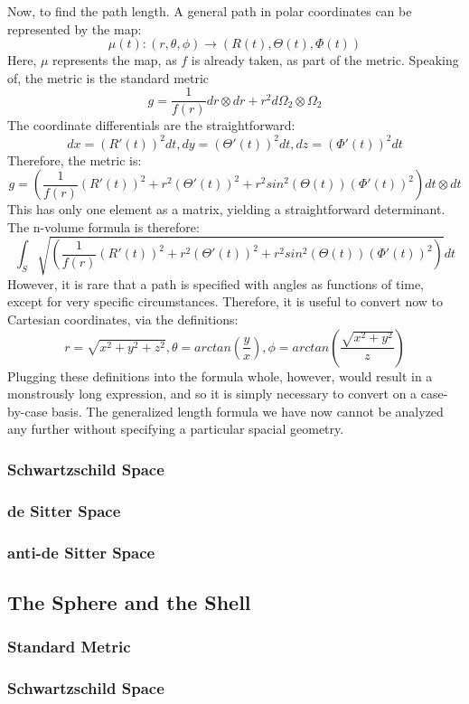 \documentclass{article}
\begin{document}
Now, to find the path length. A general path in polar coordinates can be represented by the map:
\[
\mu(t): (r, \theta, \phi) \rightarrow (R(t), \Theta(t), \Phi(t))
\]
Here, $\mu$ represents the map, as $f$ is already taken, as part of the metric. Speaking of, the metric is the standard metric
\[
g = \frac{1}{f(r)} dr \otimes dr + r^2 d\Omega_2 \otimes \Omega_2
\]
The coordinate differentials are the straightforward:
\[
dx = (R'(t))^2 dt, dy = (\Theta'(t))^2 dt, dz = (\Phi'(t))^2 dt
\]
Therefore, the metric is:
\[
g = (\frac{1}{f(r)}(R'(t))^2 + r^2 (\Theta'(t))^2 + r^2 sin^2(\Theta(t))(\Phi'(t))^2) dt \otimes dt
\]
This has only one element as a matrix, yielding a straightforward determinant. The n-volume formula is therefore:
\[
\int_S \sqrt{(\frac{1}{f(r)}(R'(t))^2 + r^2 (\Theta'(t))^2 + r^2 sin^2(\Theta(t))(\Phi'(t))^2)} dt
\]
However, it is rare that a path is specified with angles as functions of time, except for very specific circumstances. Therefore, it is useful to convert now to Cartesian coordinates, via the definitions:
\[
r = \sqrt{x^2 + y^2 + z^2}, \theta = arctan(\frac{y}{x}), \phi = arctan(\frac{\sqrt{x^2 + y^2}}{z})
\]
Plugging these definitions into the formula whole, however, would result in a monstrously long expression, and so it is simply necessary to convert on a case-by-case basis. The generalized length formula we have now cannot be analyzed any further without specifying a particular spacial geometry.

\subsubsection{Schwartzschild Space}
\subsubsection{de Sitter Space}
\subsubsection{anti-de Sitter Space}

\newpage
\subsection{The Sphere and the Shell}
\subsubsection{Standard Metric}
\subsubsection{Schwartzschild Space}
\end{document}

